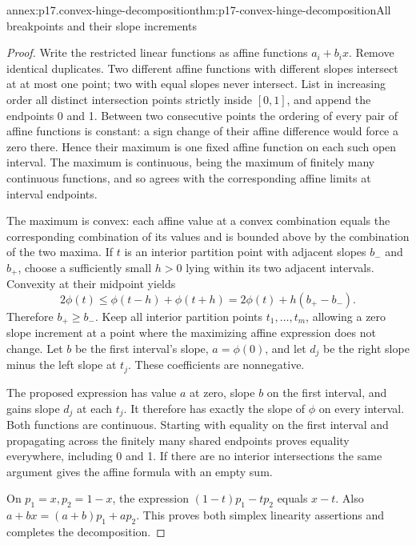 \begin{annexitem}{annex:p17.convex-hinge-decomposition}{thm:p17-convex-hinge-decomposition}{All breakpoints and their slope increments}
\begin{proof}
Write the restricted linear functions as affine functions
\(a_i+b_ix\). Remove identical duplicates.
Two different affine functions with different slopes intersect at at most
one point; two with equal slopes never intersect.
List in increasing order all distinct intersection points strictly
inside \([0,1]\), and append the endpoints 0 and 1.
Between two consecutive points the ordering of every pair of affine
functions is constant: a sign change of their affine difference would
force a zero there. Hence their maximum is one fixed affine function on
each such open interval. The maximum is continuous, being the maximum
of finitely many continuous functions, and so agrees with the corresponding
affine limits at interval endpoints.

The maximum is convex: each affine value at a convex combination equals
the corresponding combination of its values and is bounded above by the
combination of the two maxima.
If \(t\) is an interior partition point with adjacent slopes \(b_-\)
and \(b_+\), choose a sufficiently small \(h>0\) lying within its two
adjacent intervals. Convexity at their midpoint yields
\[
  2\phi(t)\leq\phi(t-h)+\phi(t+h)
             =2\phi(t)+h(b_+-b_-).
\]
Therefore \(b_+\geq b_-\).
Keep all interior partition points \(t_1,\ldots,t_m\), allowing a
zero slope increment at a point where the maximizing affine expression
does not change. Let \(b\) be the first interval's slope, \(a=\phi(0)\),
and let \(d_j\) be the right slope minus the left slope at \(t_j\).
These coefficients are nonnegative.

The proposed expression has value \(a\) at zero, slope \(b\) on the
first interval, and gains slope \(d_j\) at each \(t_j\).
It therefore has exactly the slope of \(\phi\) on every interval.
Both functions are continuous. Starting with equality on the first
interval and propagating across the finitely many shared endpoints
proves equality everywhere, including 0 and 1.
If there are no interior intersections the same argument gives the
affine formula with an empty sum.

On \(p_1=x,p_2=1-x\), the expression
\((1-t)p_1-tp_2\) equals \(x-t\).
Also \(a+bx=(a+b)p_1+ap_2\).
This proves both simplex linearity assertions and completes the decomposition.
\end{proof}
\end{annexitem}

